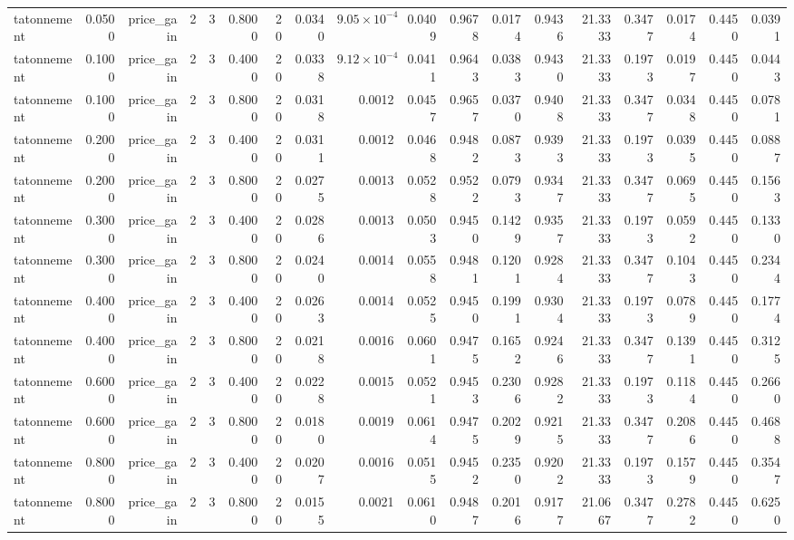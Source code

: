 \begin{table}[htbp]
\begin{tabular}{lrrrrrrrrrrrrrrrrr}
tatonnement & 0.0500 & price\_gain & 2 & 3 & 0.8000 & 20 & 0.0340 & $9.05\times10^{-4}$ & 0.0409 & 0.9678 & 0.0174 & 0.9436 & 21.3333 & 0.3477 & 0.0174 & 0.4450 & 0.0391 \\
tatonnement & 0.1000 & price\_gain & 2 & 3 & 0.4000 & 20 & 0.0338 & $9.12\times10^{-4}$ & 0.0411 & 0.9643 & 0.0383 & 0.9430 & 21.3333 & 0.1973 & 0.0197 & 0.4450 & 0.0443 \\
tatonnement & 0.1000 & price\_gain & 2 & 3 & 0.8000 & 20 & 0.0318 & 0.0012 & 0.0457 & 0.9657 & 0.0370 & 0.9408 & 21.3333 & 0.3477 & 0.0348 & 0.4450 & 0.0781 \\
tatonnement & 0.2000 & price\_gain & 2 & 3 & 0.4000 & 20 & 0.0311 & 0.0012 & 0.0468 & 0.9482 & 0.0873 & 0.9393 & 21.3333 & 0.1973 & 0.0395 & 0.4450 & 0.0887 \\
tatonnement & 0.2000 & price\_gain & 2 & 3 & 0.8000 & 20 & 0.0275 & 0.0013 & 0.0528 & 0.9522 & 0.0793 & 0.9347 & 21.3333 & 0.3477 & 0.0695 & 0.4450 & 0.1563 \\
tatonnement & 0.3000 & price\_gain & 2 & 3 & 0.4000 & 20 & 0.0286 & 0.0013 & 0.0503 & 0.9450 & 0.1429 & 0.9357 & 21.3333 & 0.1973 & 0.0592 & 0.4450 & 0.1330 \\
tatonnement & 0.3000 & price\_gain & 2 & 3 & 0.8000 & 20 & 0.0240 & 0.0014 & 0.0558 & 0.9481 & 0.1201 & 0.9284 & 21.3333 & 0.3477 & 0.1043 & 0.4450 & 0.2344 \\
tatonnement & 0.4000 & price\_gain & 2 & 3 & 0.4000 & 20 & 0.0263 & 0.0014 & 0.0525 & 0.9450 & 0.1991 & 0.9304 & 21.3333 & 0.1973 & 0.0789 & 0.4450 & 0.1774 \\
tatonnement & 0.4000 & price\_gain & 2 & 3 & 0.8000 & 20 & 0.0218 & 0.0016 & 0.0601 & 0.9475 & 0.1652 & 0.9246 & 21.3333 & 0.3477 & 0.1391 & 0.4450 & 0.3125 \\
tatonnement & 0.6000 & price\_gain & 2 & 3 & 0.4000 & 20 & 0.0228 & 0.0015 & 0.0521 & 0.9453 & 0.2306 & 0.9282 & 21.3333 & 0.1973 & 0.1184 & 0.4450 & 0.2660 \\
tatonnement & 0.6000 & price\_gain & 2 & 3 & 0.8000 & 20 & 0.0180 & 0.0019 & 0.0614 & 0.9475 & 0.2029 & 0.9215 & 21.3333 & 0.3477 & 0.2086 & 0.4450 & 0.4688 \\
tatonnement & 0.8000 & price\_gain & 2 & 3 & 0.4000 & 20 & 0.0207 & 0.0016 & 0.0515 & 0.9452 & 0.2350 & 0.9202 & 21.3333 & 0.1973 & 0.1579 & 0.4450 & 0.3547 \\
tatonnement & 0.8000 & price\_gain & 2 & 3 & 0.8000 & 20 & 0.0155 & 0.0021 & 0.0610 & 0.9487 & 0.2016 & 0.9177 & 21.0667 & 0.3477 & 0.2782 & 0.4450 & 0.6250 \\

\end{tabular}
\end{table}
